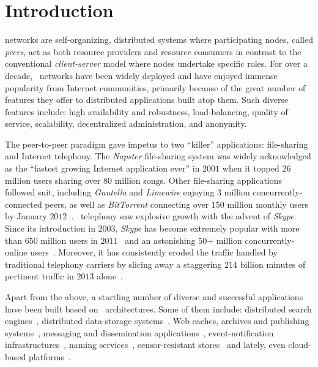 \section{Introduction}
\label{section:intro}

 networks are self-organizing, distributed systems where
participating nodes, called \emph{peers}, act as both resource providers and
resource consumers in contrast to the conventional \emph{client-server} model
where nodes undertake specific roles.
For over a decade, \p\ networks have been widely deployed and have
enjoyed immense popularity from Internet communities, primarily because
of the great number of features they offer to distributed applications 
built atop them. 
Such diverse features include:  high availability and robustness,
load-balancing, quality of service, scalability, decentralized administration,
and anonymity. 

The peer-to-peer paradigm gave impetus to two ``killer'' applications:
file-sharing and Internet telephony.
The {\sl Napster} file-sharing system was widely acknowledged as the 
``fastest growing Internet application ever'' in $2001$ when it topped
$26$ million users sharing over $80$ million songs.
Other file-sharing applications followed suit, 
including {\sl Gnutella} and {\sl Limewire} enjoying $3$ 
million concurrently-connected peers, as well as 
{\sl BitTorrent} connecting over $150$ million monthly users by January $2012$~\cite{bittorrentusers}.
\p\ telephony saw explosive growth with the advent of {\sl Skype}.
Since its introduction in $2003$,
{\sl Skype} has become extremely popular with more than $650$ million users 
in $2011$~\cite{skypetotalusers} and an astonishing 
$50$+ million concurrently-online users~\cite{skypesymusers}.
Moreover, it has consistently eroded  the traffic handled by 
traditional telephony carriers by slicing away a staggering 
$214$ billion minutes of pertinent traffic in $2013$ alone~\cite{skypetraffic}.

Apart from the above, a startling number of diverse and successful
applications have been built based on \p\ architectures. Some of them include:
distributed search engines~\cite{yaci}, 
distributed data-storage systems~\cite{kbc_oceanstore_2000,bdet_fsdfs_2000,dkkms_cfs_2001,dr_pastutility_2001,abc_farsite_2002,mmfc_ivy_2002,arla,agebh_dks_2003},
Web caches, archives and publishing systems~\cite{ird_squirrel_2002,bags_youserv_2002,wrc_publius_2000,wm_tangler_2001},
messaging and dissemination applications~\cite{threedegrees,icpp08-pd}, 
event-notification infrastructures~\cite{rkcd_scribe_2001,cdkr_scribe_2002,agebh_dks_2003}, 
naming services~\cite{cmm_chorddns_2002}, 
censor-resistant stores~\cite{cswh_freenet_2001} and
lately, even cloud-based platforms~\cite{mgpj_cloudsnap_2011}.

